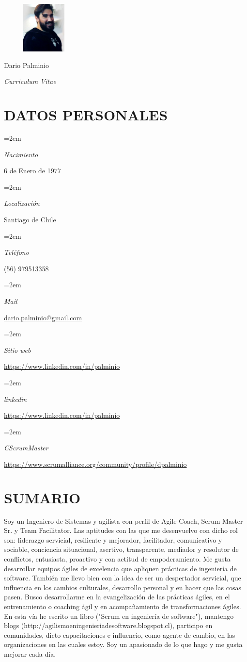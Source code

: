 \documentclass[paper=a4,fontsize=11pt]{scrartcl} %
\newlength{\spacebox}
\newcommand{\sepspace}{\vspace*{1em}}		%
\newcommand{\MyName}[1]{ %
		\Huge \usefont{OT1}{phv}{b}{n} \hfill #1
		\par \normalsize \normalfont}
\newcommand{\MySlogan}[1]{ %
		\large \usefont{OT1}{phv}{m}{n}\hfill \textit{#1}
		\par \normalsize \normalfont}
\newcommand{\NewPart}[1]{\section*{\uppercase{#1}}}
\newcommand{\PersonalEntry}[2]{
		\noindent\hangindent=2em\hangafter=0 %
		\parbox{\spacebox}{        %
		\textit{#1}}		       %
		\hspace{1.5em} #2 \par}    %
\begin{document}

\begin{figure}
	\hfill
	\includegraphics[width=0.2\textwidth]{photo2}
	\vspace{-7cm}
\end{figure}

\MyName{Dario Palminio}
\MySlogan{Curriculum Vitae}

\sepspace

\NewPart{Datos personales}{}

\PersonalEntry{Nacimiento}{6 de Enero de 1977}
\PersonalEntry{Localización}{Santiago de Chile}
\PersonalEntry{Teléfono}{(56) 979513358}
\PersonalEntry{Mail}{\url{dario.palminio@gmail.com}}
\PersonalEntry{Sitio web}{\url{https://www.linkedin.com/in/palminio}}
\PersonalEntry{linkedin}{\url{https://www.linkedin.com/in/palminio}}
\PersonalEntry{CScrumMaster}{\url{https://www.scrumalliance.org/community/profile/dpalminio}}

\NewPart{Sumario}{}

Soy un Ingeniero de Sistemas y agilista con perfil de Agile Coach, Scrum Master Sr. y Team Facilitator. Las aptitudes con las que me desenvuelvo con dicho rol son: liderazgo servicial, resiliente y mejorador, facilitador, comunicativo y sociable, conciencia situacional, asertivo, transparente, mediador y resolutor de conflictos, entusiasta, proactivo y con actitud de empoderamiento. 
Me gusta desarrollar equipos ágiles de excelencia que apliquen prácticas de ingeniería de software. También me llevo bien con la idea de ser un despertador servicial, que influencia en los cambios culturales, desarrollo personal y en hacer que las cosas pasen. Busco desarrollarme en la evangelización de las prácticas ágiles, en el entrenamiento o coaching ágil y en acompañamiento de transformaciones ágiles. En esta vía he escrito un libro ("Scrum en ingeniería de software"), mantengo blogs (http://agilismoeningenieriadesoftware.blogspot.cl), participo en comunidades, dicto capacitaciones e influencio, como agente de cambio, en las organizaciones en las cuales estoy. Soy un apasionado de lo que hago y me gusta mejorar cada día.
\end{document}
